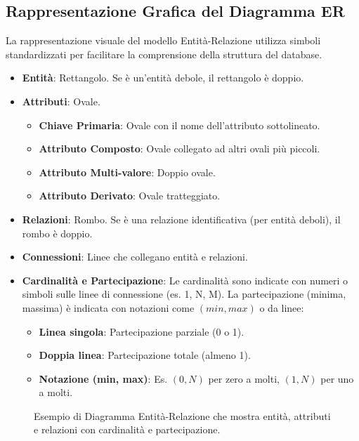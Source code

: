 \subsection{Rappresentazione Grafica del Diagramma ER}
La rappresentazione visuale del modello Entità-Relazione utilizza simboli standardizzati per facilitare la comprensione della struttura del database.
\begin{itemize}
    \item \textbf{Entità}: Rettangolo. Se è un'entità debole, il rettangolo è doppio.
    \item \textbf{Attributi}: Ovale.
    \begin{itemize}
        \item \textbf{Chiave Primaria}: Ovale con il nome dell'attributo sottolineato.
        \item \textbf{Attributo Composto}: Ovale collegato ad altri ovali più piccoli.
        \item \textbf{Attributo Multi-valore}: Doppio ovale.
        \item \textbf{Attributo Derivato}: Ovale tratteggiato.
    \end{itemize}
    \item \textbf{Relazioni}: Rombo. Se è una relazione identificativa (per entità deboli), il rombo è doppio.
    \item \textbf{Connessioni}: Linee che collegano entità e relazioni.
    \item \textbf{Cardinalità e Partecipazione}: Le cardinalità sono indicate con numeri o simboli sulle linee di connessione (es. 1, N, M). La partecipazione (minima, massima) è indicata con notazioni come $(min, max)$ o da linee:
    \begin{itemize}
        \item \textbf{Linea singola}: Partecipazione parziale (0 o 1).
        \item \textbf{Doppia linea}: Partecipazione totale (almeno 1).
        \item \textbf{Notazione (min, max)}: Es. $(0, N)$ per zero a molti, $(1, N)$ per uno a molti.
    \end{itemize}
\end{itemize}
\begin{figure}[h!]
    \centering
    \caption{Esempio di Diagramma Entità-Relazione che mostra entità, attributi e relazioni con cardinalità e partecipazione.}
    \label{fig:diagramma_er_uml}
\end{figure}

